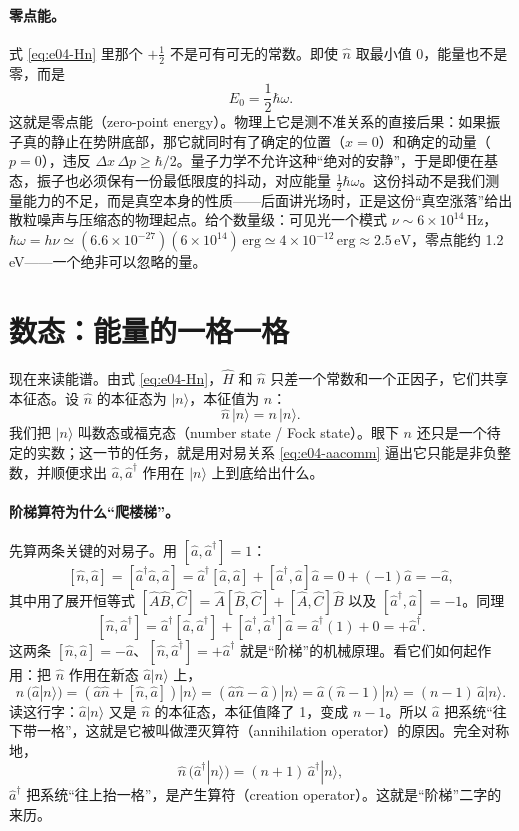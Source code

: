 \paragraph{零点能。}
式 \eqref{eq:e04-Hn} 里那个 \(+\tfrac12\) 不是可有可无的常数。即使 \(\hat n\) 取最小值 0，能量也不是零，而是
\[
  E_0=\frac12\hbar\omega .
\]
这就是零点能（zero-point energy）。物理上它是测不准关系的直接后果：如果振子真的静止在势阱底部，那它就同时有了确定的位置（\(x=0\)）和确定的动量（\(p=0\)），违反 \(\Delta x\,\Delta p\ge\hbar/2\)。量子力学不允许这种“绝对的安静”，于是即便在基态，振子也必须保有一份最低限度的抖动，对应能量 \(\tfrac12\hbar\omega\)。这份抖动不是我们测量能力的不足，而是真空本身的性质——后面讲光场时，正是这份“真空涨落”给出散粒噪声与压缩态的物理起点。给个数量级：可见光一个模式 \(\nu\sim6\times10^{14}\,\mathrm{Hz}\)，\(\hbar\omega=h\nu\simeq(6.6\times10^{-27})(6\times10^{14})\,\mathrm{erg}\simeq4\times10^{-12}\,\mathrm{erg}\approx2.5\,\mathrm{eV}\)，零点能约 1.2 eV——一个绝非可以忽略的量。

\section{数态：能量的一格一格}
\label{sec:e04-numberstates}

现在来读能谱。由式 \eqref{eq:e04-Hn}，\(\hat H\) 和 \(\hat n\) 只差一个常数和一个正因子，它们共享本征态。设 \(\hat n\) 的本征态为 \(|n\rangle\)，本征值为 \(n\)：
\[
  \hat n\,|n\rangle=n\,|n\rangle .
\]
我们把 \(|n\rangle\) 叫数态或福克态（number state / Fock state）。眼下 \(n\) 还只是一个待定的实数；这一节的任务，就是用对易关系 \eqref{eq:e04-aacomm} 逼出它只能是非负整数，并顺便求出 \(\hat a,\hat a^\dagger\) 作用在 \(|n\rangle\) 上到底给出什么。

\paragraph{阶梯算符为什么“爬楼梯”。}
先算两条关键的对易子。用 \([\hat a,\hat a^\dagger]=1\)：
\[
  [\hat n,\hat a]=[\hat a^\dagger\hat a,\hat a]
  =\hat a^\dagger[\hat a,\hat a]+[\hat a^\dagger,\hat a]\hat a
  =0+(-1)\hat a=-\hat a,
\]
其中用了展开恒等式 \([\hat A\hat B,\hat C]=\hat A[\hat B,\hat C]+[\hat A,\hat C]\hat B\) 以及 \([\hat a^\dagger,\hat a]=-1\)。同理
\[
  [\hat n,\hat a^\dagger]=\hat a^\dagger[\hat a,\hat a^\dagger]+[\hat a^\dagger,\hat a^\dagger]\hat a
  =\hat a^\dagger(1)+0=+\hat a^\dagger .
\]
这两条 \([\hat n,\hat a]=-\hat a\)、\([\hat n,\hat a^\dagger]=+\hat a^\dagger\) 就是“阶梯”的机械原理。看它们如何起作用：把 \(\hat n\) 作用在新态 \(\hat a|n\rangle\) 上，
\[
  \hat n\,(\hat a|n\rangle)
  =(\hat a\hat n+[\hat n,\hat a])|n\rangle
  =(\hat a\hat n-\hat a)|n\rangle
  =\hat a(\hat n-1)|n\rangle
  =(n-1)\,\hat a|n\rangle .
\]
读这行字：\(\hat a|n\rangle\) 又是 \(\hat n\) 的本征态，本征值降了 1，变成 \(n-1\)。所以 \(\hat a\) 把系统“往下带一格”，这就是它被叫做湮灭算符（annihilation operator）的原因。完全对称地，
\[
  \hat n\,(\hat a^\dagger|n\rangle)=(n+1)\,\hat a^\dagger|n\rangle,
\]
\(\hat a^\dagger\) 把系统“往上抬一格”，是产生算符（creation operator）。这就是“阶梯”二字的来历。

